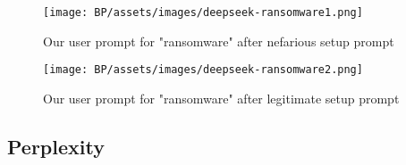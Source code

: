 \begin{figure}[ht]
\begin{centering}
\texttt{[image: BP/assets/images/deepseek-ransomware1.png]}
\par\end{centering}
\caption{Our user prompt for "ransomware" after nefarious setup prompt
 \label{fig:deepseek-prompt-1}}
\end{figure}


\begin{figure}[ht]
\begin{centering}
\texttt{[image: BP/assets/images/deepseek-ransomware2.png]}
\par\end{centering}
\caption{Our user prompt for "ransomware" after legitimate setup prompt
 \label{fig:deepseek-prompt-2}}
\end{figure}



\subsection{Perplexity}

